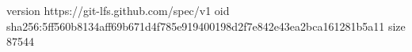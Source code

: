 version https://git-lfs.github.com/spec/v1
oid sha256:5ff560b8134aff69b671d4f785e919400198d2f7e842e43ea2bca161281b5a11
size 87544
